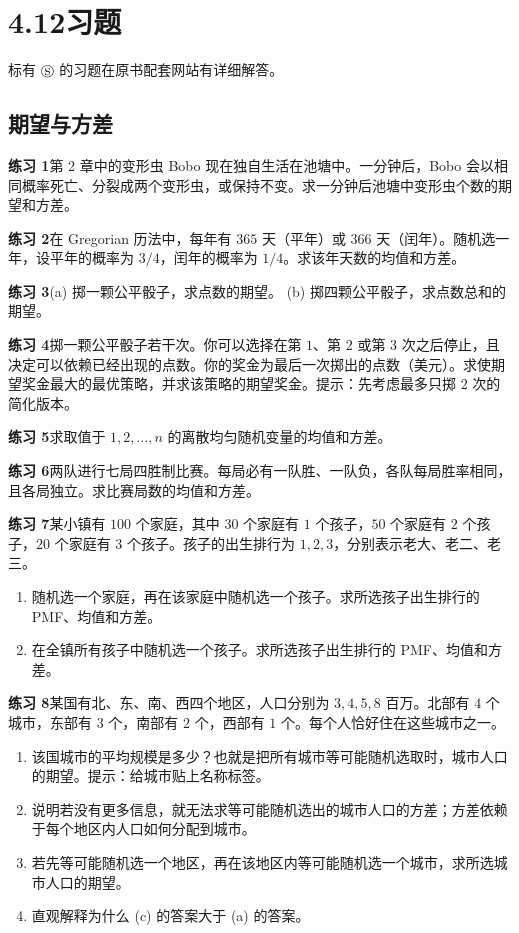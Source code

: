 \documentclass[UTF8, 12pt, fontset=fandol, oneside]{ctexart}
\begin{document}
\section*{4.12\quad 习题}

标有 $\circledS$ 的习题在原书配套网站有详细解答。

\subsection*{期望与方差}

\noindent\textbf{练习 1}\quad 第 2 章中的变形虫 Bobo 现在独自生活在池塘中。一分钟后，Bobo 会以相同概率死亡、分裂成两个变形虫，或保持不变。求一分钟后池塘中变形虫个数的期望和方差。

\noindent\textbf{练习 2}\quad 在 Gregorian 历法中，每年有 $365$ 天（平年）或 $366$ 天（闰年）。随机选一年，设平年的概率为 $3/4$，闰年的概率为 $1/4$。求该年天数的均值和方差。

\noindent\textbf{练习 3}\quad (a) 掷一颗公平骰子，求点数的期望。 (b) 掷四颗公平骰子，求点数总和的期望。

\noindent\textbf{练习 4}\quad 掷一颗公平骰子若干次。你可以选择在第 $1$、第 $2$ 或第 $3$ 次之后停止，且决定可以依赖已经出现的点数。你的奖金为最后一次掷出的点数（美元）。求使期望奖金最大的最优策略，并求该策略的期望奖金。提示：先考虑最多只掷 $2$ 次的简化版本。

\noindent\textbf{练习 5}\quad 求取值于 $1,2,\ldots,n$ 的离散均匀随机变量的均值和方差。

\noindent\textbf{练习 6}\quad 两队进行七局四胜制比赛。每局必有一队胜、一队负，各队每局胜率相同，且各局独立。求比赛局数的均值和方差。

\noindent\textbf{练习 7}\quad 某小镇有 $100$ 个家庭，其中 $30$ 个家庭有 $1$ 个孩子，$50$ 个家庭有 $2$ 个孩子，$20$ 个家庭有 $3$ 个孩子。孩子的出生排行为 $1,2,3$，分别表示老大、老二、老三。
\begin{enumerate}
  \item[(a)] 随机选一个家庭，再在该家庭中随机选一个孩子。求所选孩子出生排行的 PMF、均值和方差。
  \item[(b)] 在全镇所有孩子中随机选一个孩子。求所选孩子出生排行的 PMF、均值和方差。
\end{enumerate}

\noindent\textbf{练习 8}\quad 某国有北、东、南、西四个地区，人口分别为 $3,4,5,8$ 百万。北部有 $4$ 个城市，东部有 $3$ 个，南部有 $2$ 个，西部有 $1$ 个。每个人恰好住在这些城市之一。
\begin{enumerate}
  \item[(a)] 该国城市的平均规模是多少？也就是把所有城市等可能随机选取时，城市人口的期望。提示：给城市贴上名称标签。
  \item[(b)] 说明若没有更多信息，就无法求等可能随机选出的城市人口的方差；方差依赖于每个地区内人口如何分配到城市。
  \item[(c)] 若先等可能随机选一个地区，再在该地区内等可能随机选一个城市，求所选城市人口的期望。
  \item[(d)] 直观解释为什么 (c) 的答案大于 (a) 的答案。
\end{enumerate}
\end{document}
